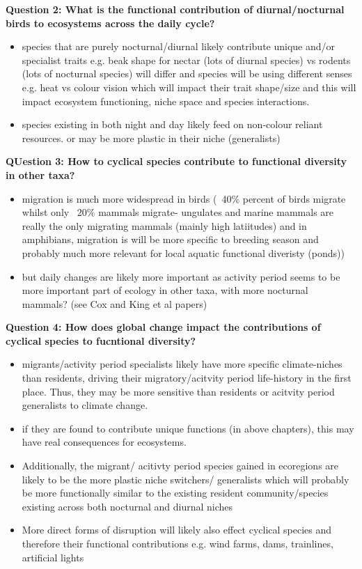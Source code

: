 \documentclass[11pt]{report}
\begin{document}
\textbf{Question 2: What is the functional contribution of diurnal/nocturnal birds to ecosystems across the daily cycle?}

\begin{itemize}
\item species that are purely nocturnal/diurnal likely contribute unique and/or specialist traits e.g. beak shape for nectar (lots of diurnal species) vs rodents (lots of nocturnal species) will differ and species will be using different senses e.g. heat vs colour vision which will impact their trait shape/size and this will impact ecosystem functioning, niche space and species interactions.
\item species existing in both night and day likely feed on non-colour reliant resources. or may be more plastic in their niche (generalists)
\end{itemize}

\textbf{QUestion 3: How to cyclical species contribute to functional diversity in other taxa?} 
\begin{itemize}
\item migration is much more widespread in birds (~40\% percent of birds migrate whilst only ~20\%  mammals migrate- ungulates and marine mammals are really the only migrating mammals (mainly high latiitudes) and in amphibians, migration is will be more specific to breeding season and probably much more relevant for local aquatic functional diveristy (ponds))
\item but daily changes are likely more important as activity period seems to be more important part of ecology in other taxa, with more nocturnal mammals? (see Cox and King et al papers)
\end{itemize}

\textbf{Question 4: How does global change impact the contributions of cyclical species to fucntional diversity?}
\begin{itemize}
\item migrants/activity period specialists likely have more specific climate-niches than residents, driving their migratory/acitvity period life-history in the first place. Thus, they may be more sensitive than residents or acitvity period generalists to climate change.
\item if they are found to contribute unique functions (in above chapters), this may have real consequences for ecosystems. 
\item Additionally, the migrant/ acitivty period species gained in ecoregions are likely to be the more plastic niche switchers/ generalists which will probably be more functionally similar to the existing resident community/species existing across both nocturnal and diurnal niches
\item More direct forms of disruption will likely also effect cyclical species and therefore their functional contributions e.g. wind farms, dams, trainlines, artificial lights
\end{itemize}
\end{document}
